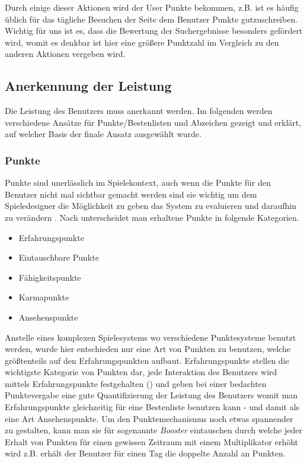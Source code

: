 \documentclass[12pt,twoside]{book}
\begin{document}
Durch einige dieser Aktionen wird der User Punkte bekommen, z.B. ist es häufig üblich für das tägliche Besuchen der Seite dem Benutzer Punkte gutzuschreiben. Wichtig für uns ist es, dass die Bewertung der Suchergebnisse besonders gefördert wird, womit es denkbar ist hier eine größere Punktzahl im Vergleich zu den anderen Aktionen vergeben wird.

\subsection{Anerkennung der Leistung}

Die Leistung des Benutzers muss anerkannt werden. Im folgenden werden verschiedene Ansätze für Punkte/Bestenlisten und Abzeichen gezeigt und erklärt, auf welcher Basis der finale Ansatz ausgewählt wurde.

\subsubsection{Punkte}
Punkte sind unerlässlich im Spielekontext, auch wenn die Punkte für den Benutzer nicht mal sichtbar gemacht werden sind sie wichtig um dem Spieledesigner die Möglichkeit zu geben das System zu evaluieren und daraufhin zu verändern \cite{zichermann2011gamification, 36}. Nach \citep{zichermann2011gamification, 38} unterscheidet man erhaltene Punkte in folgende Kategorien.

\begin{itemize}
	\item Erfahrungspunkte
    \item Eintauschbare Punkte
    \item Fähigkeitspunkte
    \item Karmapunkte
    \item Ansehenspunkte
\end{itemize}


Anstelle eines komplexen Spielesystems wo verschiedene Punktesysteme benutzt werden, wurde hier entschieden nur eine Art von Punkten zu benutzen, welche größtenteils auf den Erfahrungspunkten aufbaut. Erfahrungspunkte stellen die wichtigste Kategorie von Punkten dar, jede Interaktion des Benutzers wird mittels Erfahrungspunkte festgehalten (\citep{zichermann2011gamification, 38 - 39}) und geben bei einer bedachten Punktevergabe  eine gute Quantifizierung der Leistung des Benutzers womit man Erfahrungspunkte gleichzeitig für eine Bestenliste benutzen kann - und damit als eine Art Ansehenspunkte. Um den Punktemechanismus noch etwas spannender zu gestalten, kann man sie für sogenannte \textit{Booster} eintauschen durch welche jeder Erhalt von Punkten für einen gewissen Zeitraum mit einem Multiplikator erhöht wird z.B. erhält der Benutzer für einen Tag die doppelte Anzahl an Punkten.
\end{document}
